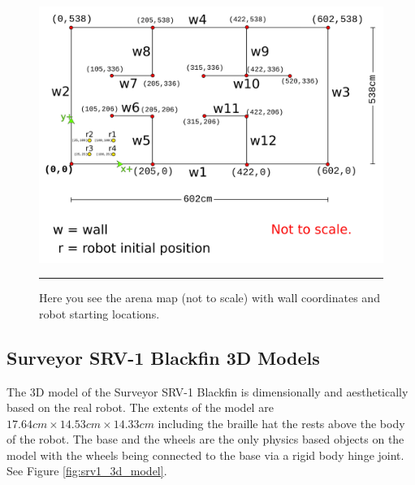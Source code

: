 \begin{figure}[htbp]
\centering
\includegraphics[scale=0.7]{../Figures/Chapter5/map.png}
\rule{35em}{0.5pt}
\caption[BlenderSim Arena]{Here you see the arena map (not to scale) with wall coordinates and robot starting locations.}
\label{fig:arena_map}
\end{figure}

\subsection{Surveyor SRV-1 Blackfin 3D Models}

The 3D model of the Surveyor SRV-1 Blackfin is dimensionally and aesthetically based on the real robot. The extents of the model are $17.64cm\times14.53cm\times14.33cm$ including the braille hat the rests above the body of the robot. The base and the wheels are the only physics based objects on the model with the wheels being connected to the base via a rigid body hinge joint. See Figure \ref{fig:srv1_3d_model}.

